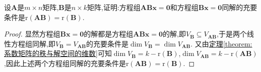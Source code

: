 \documentclass[lang=cn,newtx,10pt,scheme=chinese]{elegantbook}
\begin{document}
\begin{proposition}\label{proposition:ABx=O与Bx=O同解的充要条件}
设\(\boldsymbol{A}\)是\(m\times n\)矩阵,\(\boldsymbol{B}\)是\(n\times k\)矩阵,证明:方程组\(\boldsymbol{A}\boldsymbol{B}\boldsymbol{x}=\boldsymbol{0}\)和方程组\(\boldsymbol{B}\boldsymbol{x}=\boldsymbol{0}\)同解的充要条件是\(\mathrm{r}(\boldsymbol{A}\boldsymbol{B})=\mathrm{r}(\boldsymbol{B})\).
\end{proposition}
\begin{proof}
显然方程组\(\boldsymbol{B}\boldsymbol{x}=\boldsymbol{0}\)的解都是方程组\(\boldsymbol{A}\boldsymbol{B}\boldsymbol{x}=\boldsymbol{0}\)的解,即\(V_{\boldsymbol{B}}\subseteq V_{\boldsymbol{A}\boldsymbol{B}}\),于是两个线性方程组同解,即\(V_{\boldsymbol{B}} = V_{\boldsymbol{A}\boldsymbol{B}}\)的充要条件是\(\dim V_{\boldsymbol{B}}=\dim V_{\boldsymbol{A}\boldsymbol{B}}\). 又由\hyperref[theorem:系数矩阵的秩与解空间的维数]{定理\ref{theorem:系数矩阵的秩与解空间的维数}}可知\(\dim V_{\boldsymbol{B}}=k - \mathrm{r}(\boldsymbol{B})\),\(\dim V_{\boldsymbol{A}\boldsymbol{B}}=k - \mathrm{r}(\boldsymbol{A}\boldsymbol{B})\),因此上述两个方程组同解的充要条件是\(\mathrm{r}(\boldsymbol{A}\boldsymbol{B})=\mathrm{r}(\boldsymbol{B})\). 
\end{proof}
\end{document}
